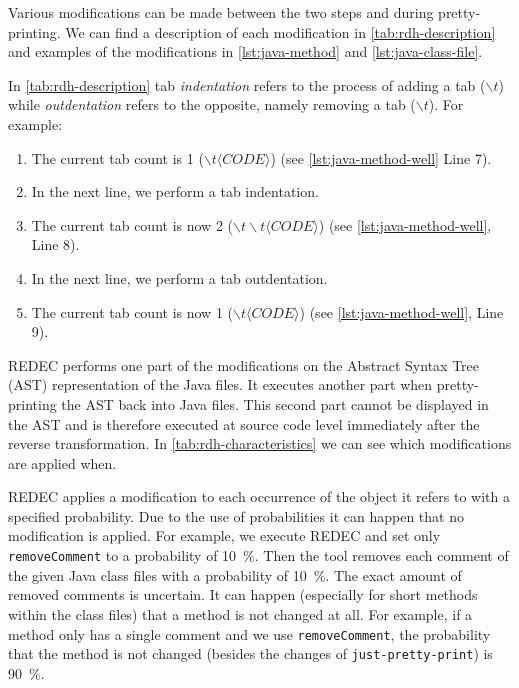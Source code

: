 \documentclass[%
class=scrreprt,
chapterprefix=false,%
open=right,%
twoside=false,%
paper=a4,%
logofile={Logo\_zentral\_farbig\_EN.png},%
thesistype=master,%
UKenglish,%
]{se2thesis}
\theoremstyle{definition}
\newcommand{\rdh}{REDEC\xspace}
\newcommand{\none}{just-pretty-print\xspace} %
\newcommand{\nonet}{\texttt{\none}\xspace} %
\begin{document}
	
	Various modifications can be made between the two steps and during pretty-printing. We can find a description of each modification in \autoref{tab:rdh-description} and examples of the modifications in \autoref{lst:java-method} and \autoref{lst:java-class-file}.
	
	In \autoref{tab:rdh-description} tab \textit{indentation} refers to the process of adding a tab ($\backslash t$) while \textit{outdentation} refers to the opposite, namely removing a tab ($\backslash t$). 
	For example:
	\begin{enumerate}
		\item The current tab count is 1 ($\backslash t \langle CODE \rangle$) (see \autoref{lst:java-method-well} Line 7).
		\item In the next line, we perform a tab indentation.
		\item The current tab count is now 2 ($\backslash t \backslash t \langle CODE \rangle $) (see \autoref{lst:java-method-well}, Line 8).
		\item In the next line, we perform a tab outdentation.
		\item The current tab count is now 1 ($\backslash t \langle CODE \rangle $) (see \autoref{lst:java-method-well}, Line 9).
	\end{enumerate}
		
	\rdh performs one part of the modifications on the Abstract Syntax Tree (AST) representation of the Java files. It executes another part when pretty-printing the AST back into Java files. This second part cannot be displayed in the AST and is therefore executed at source code level immediately after the reverse transformation. In \autoref{tab:rdh-characteristics} we can see which modifications are applied when.
	
	\rdh applies a modification to each occurrence of the object it refers to with a specified probability. Due to the use of probabilities it can happen that no modification is applied. For example, we execute \rdh and set only \texttt{removeComment} to a probability of 10~\%. Then the tool removes each comment of the given Java class files with a probability of 10~\%. The exact amount of removed comments is uncertain. It can happen (especially for short methods within the class files) that a method is not changed at all. For example, if a method only has a single comment and we use \texttt{removeComment}, the probability that the method is not changed (besides the changes of \nonet) is 90~\%.
\end{document}
